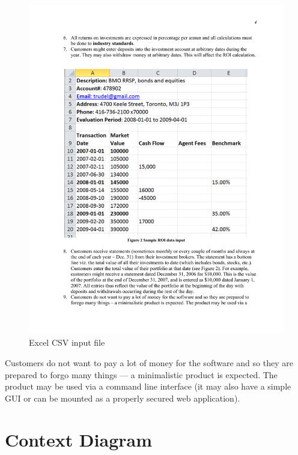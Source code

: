 \documentclass[runningheads,12pt]{article}
\begin{document}
\begin{figure}
\centering
\includegraphics[scale=0.6]{inputs/excel-csv.pdf}

\caption{Excel CSV input file}
\label{fig:csv}
\end{figure}

Customers do not want to pay a lot of money for the software and so they are prepared to forgo many things --- a minimalistic product is expected. The product may be used via a command line interface (it may also have a simple GUI or can be mounted as a properly secured web application). 


\section{Context Diagram}
\end{document}
